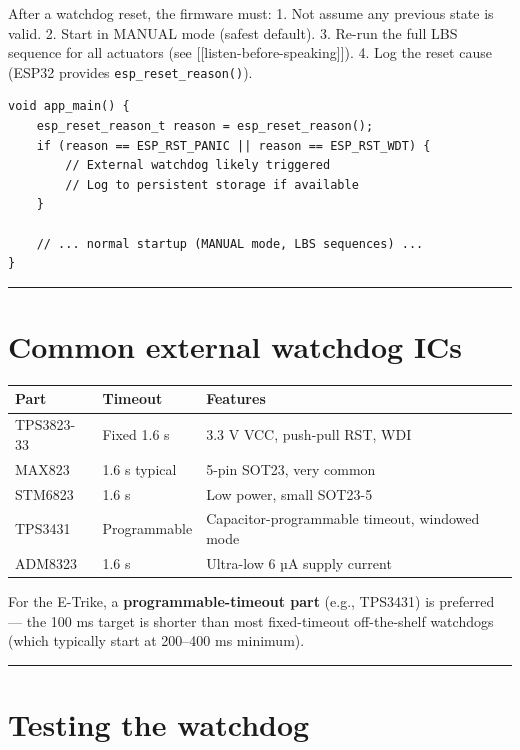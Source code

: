 \documentclass[12pt,a4paper,oneside]{report}
\begin{document}
After a watchdog reset, the firmware must: 1. Not assume any previous state is
valid. 2. Start in MANUAL mode (safest default). 3. Re-run the full LBS sequence
for all actuators (see {[}{[}listen-before-speaking{]}{]}). 4. Log the reset
cause (ESP32 provides \texttt{esp\_reset\_reason()}).

\begin{verbatim}
void app_main() {
    esp_reset_reason_t reason = esp_reset_reason();
    if (reason == ESP_RST_PANIC || reason == ESP_RST_WDT) {
        // External watchdog likely triggered
        // Log to persistent storage if available
    }

    // ... normal startup (MANUAL mode, LBS sequences) ...
}
\end{verbatim}

\begin{center}\rule{0.5\linewidth}{0.5pt}\end{center}

\section{Common external watchdog ICs}\label{common-external-watchdog-ics}

\begin{longtable}[]{@{}lll@{}}
\toprule\noalign{}
Part & Timeout & Features \\
\midrule\noalign{}
\endhead
\bottomrule\noalign{}
\endlastfoot
TPS3823-33 & Fixed 1.6 s & 3.3 V VCC, push-pull RST, WDI \\
MAX823 & 1.6 s typical & 5-pin SOT23, very common \\
STM6823 & 1.6 s & Low power, small SOT23-5 \\
TPS3431 & Programmable & Capacitor-programmable timeout, windowed mode \\
ADM8323 & 1.6 s & Ultra-low 6 µA supply current \\
\end{longtable}

For the E-Trike, a \textbf{programmable-timeout part} (e.g., TPS3431) is
preferred --- the 100 ms target is shorter than most fixed-timeout off-the-shelf
watchdogs (which typically start at 200--400 ms minimum).

\begin{center}\rule{0.5\linewidth}{0.5pt}\end{center}

\section{Testing the watchdog}\label{testing-the-watchdog}
\end{document}
